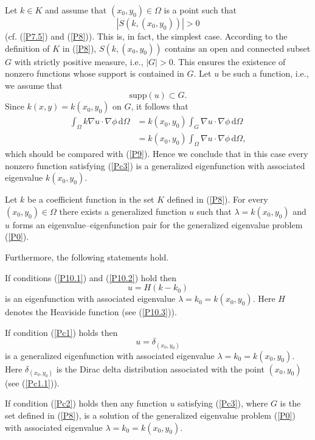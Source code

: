 \documentclass{imanum}
\begin{document}
Let $k \in K$ and assume that $(x_0,y_0) \in \Omega$ is a point
such that
\begin{equation}
|S(k,(x_0,y_0))| > 0
\label{Pc2}
\end{equation}
(cf. (\ref{P7.5}) and (\ref{P8})).
This is, in fact, the simplest case. According to the definition
of $K$ in (\ref{P8}), $S(k,(x_0,y_0))$ contains an open and connected subset
$G$ with strictly positive measure, i.e., $|G|>0$. This ensures the
existence of nonzero functions whose support is contained in $G$.
Let $u$ be such a function, i.e., we assume that
\begin{equation}
\mathrm{supp}(u) \subset G.
\label{Pc3}
\end{equation}
Since $k(x,y) = k(x_0,y_0)$ on $G$, it follows that
\begin{align*}
\int_\Omega k \nabla u \cdot \nabla \phi\, \mathrm{d} \Omega &=
k(x_0,y_0) \int_G \nabla u \cdot \nabla \phi\,
\mathrm{d} \Omega \\[3pt]
&= k(x_0,y_0) \int_\Omega \nabla u \cdot \nabla \phi \,
\mathrm{d} \Omega,
\end{align*}
which should be compared with (\ref{P9}). Hence we conclude
that in this case every nonzero function satisfying (\ref{Pc3})
is a generalized eigenfunction with associated eigenvalue
$k(x_0,y_0)$.

\begin{theorem}
Let $k$ be a coefficient function in the set $K$ defined in (\ref{P8}).
For every $(x_0,y_0) \in \Omega$ there exists a generalized function
$u$ such that $\lambda=k(x_0,y_0)$ and $u$ forms an
eigenvalue--eigenfunction pair for the generalized eigenvalue
problem (\ref{P0}).

Furthermore, the following statements hold.
\begin{BulletedList}
\item
If conditions (\ref{P10.1}) and (\ref{P10.2}) hold then
\begin{equation*}
u=H(k-k_0)
\end{equation*}
is an eigenfunction with associated eigenvalue
$\lambda = k_0 = k(x_0,y_0)$. Here $H$ denotes the Heaviside
function (see (\ref{P10.3})).

\item
If condition (\ref{Pc1}) holds then
\begin{equation*}
u=\delta_{(x_0,y_0)}
\end{equation*}
is a generalized eigenfunction with associated eigenvalue
$\lambda = k_0 = k(x_0,y_0)$. Here $\delta_{(x_0,y_0)}$ is
the Dirac delta distribution associated with the point
$(x_0,y_0)$ (see (\ref{Pc1.1})).

\item
If condition (\ref{Pc2}) holds then any function $u$ satisfying
(\ref{Pc3}), where $G$ is the set defined in (\ref{P8}), is a solution
of the generalized eigenvalue problem (\ref{P0}) with associated
eigenvalue $\lambda = k_0 = k(x_0,y_0)$.
\end{BulletedList}
\end{theorem}
\end{document}
